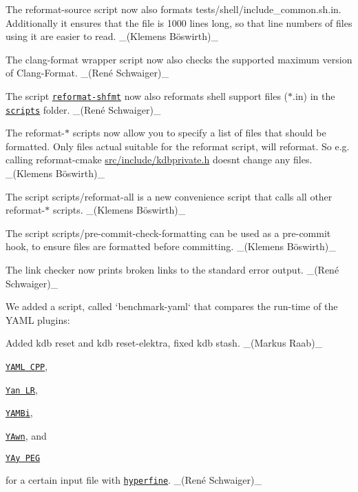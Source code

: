 \begin{DoxyItemize}
\item The {\ttfamily reformat-\/source} script now also formats {\ttfamily tests/shell/include\+\_\+common.\+sh.\+in}. Additionally it ensures that the file is 1000 lines long, so that line numbers of files using it are easier to read. \+\_\+(Klemens Böswirth)\+\_\+
\item The clang-\/format wrapper script now also checks the supported maximum version of Clang-\/\+Format. \+\_\+(René Schwaiger)\+\_\+
\item The script \href{https://master.libelektra.org/scripts/reformat-shfmt}{\tt {\ttfamily reformat-\/shfmt}} now also reformats shell support files ({\ttfamily $\ast$.in}) in the \href{https://master.libelektra.org/scripts}{\tt {\ttfamily scripts}} folder. \+\_\+(René Schwaiger)\+\_\+
\item The {\ttfamily reformat-\/$\ast$} scripts now allow you to specify a list of files that should be formatted. Only files actual suitable for the reformat script, will reformat. So e.\+g. calling {\ttfamily reformat-\/cmake \hyperlink{kdbprivate_8h}{src/include/kdbprivate.\+h}} doesn\textquotesingle{}t change any files. \+\_\+(Klemens Böswirth)\+\_\+
\item The script {\ttfamily scripts/reformat-\/all} is a new convenience script that calls all other {\ttfamily reformat-\/$\ast$} scripts. \+\_\+(Klemens Böswirth)\+\_\+
\item The script {\ttfamily scripts/pre-\/commit-\/check-\/formatting} can be used as a pre-\/commit hook, to ensure files are formatted before committing. \+\_\+(Klemens Böswirth)\+\_\+
\item The link checker now prints broken links to the standard error output. \+\_\+(René Schwaiger)\+\_\+
\item We added a script, called `benchmark-\/yaml` that compares the run-\/time of the Y\+A\+ML plugins\+:
\item Added {\ttfamily kdb reset} and {\ttfamily kdb reset-\/elektra}, fixed {\ttfamily kdb stash}. \+\_\+(\+Markus Raab)\+\_\+
\begin{DoxyItemize}
\item \href{https://www.libelektra.org/plugins/yamlcpp}{\tt Y\+A\+ML C\+PP},
\item \href{https://www.libelektra.org/plugins/yanlr}{\tt Yan LR},
\item \href{https://www.libelektra.org/plugins/yambi}{\tt Y\+A\+M\+Bi},
\item \href{https://www.libelektra.org/plugins/yambi}{\tt Y\+Awn}, and
\item \href{https://www.libelektra.org/plugins/yaypeg}{\tt Y\+Ay P\+EG}
\end{DoxyItemize}

for a certain input file with \href{https://github.com/sharkdp/hyperfine}{\tt hyperfine}. \+\_\+(René Schwaiger)\+\_\+
\end{DoxyItemize}

